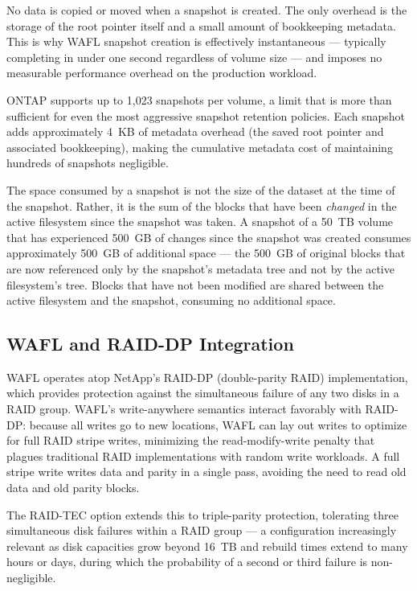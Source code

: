 No data is copied or moved when a snapshot is created. The only overhead is the storage of the root pointer itself and a small amount of bookkeeping metadata. This is why WAFL snapshot creation is effectively instantaneous --- typically completing in under one second regardless of volume size --- and imposes no measurable performance overhead on the production workload.

ONTAP supports up to 1,023 snapshots per volume, a limit that is more than sufficient for even the most aggressive snapshot retention policies. Each snapshot adds approximately 4~KB of metadata overhead (the saved root pointer and associated bookkeeping), making the cumulative metadata cost of maintaining hundreds of snapshots negligible.

The space consumed by a snapshot is not the size of the dataset at the time of the snapshot. Rather, it is the sum of the blocks that have been \emph{changed} in the active filesystem since the snapshot was taken. A snapshot of a 50~TB volume that has experienced 500~GB of changes since the snapshot was created consumes approximately 500~GB of additional space --- the 500~GB of original blocks that are now referenced only by the snapshot's metadata tree and not by the active filesystem's tree. Blocks that have not been modified are shared between the active filesystem and the snapshot, consuming no additional space.

\subsection{WAFL and RAID-DP Integration}

WAFL operates atop NetApp's RAID-DP (double-parity RAID) implementation, which provides protection against the simultaneous failure of any two disks in a RAID group. WAFL's write-anywhere semantics interact favorably with RAID-DP: because all writes go to new locations, WAFL can lay out writes to optimize for full RAID stripe writes, minimizing the read-modify-write penalty that plagues traditional RAID implementations with random write workloads. A full stripe write writes data and parity in a single pass, avoiding the need to read old data and old parity blocks.

The RAID-TEC option extends this to triple-parity protection, tolerating three simultaneous disk failures within a RAID group --- a configuration increasingly relevant as disk capacities grow beyond 16~TB and rebuild times extend to many hours or days, during which the probability of a second or third failure is non-negligible.

